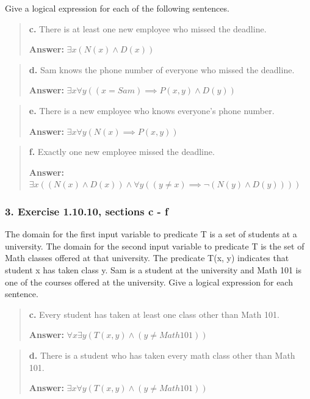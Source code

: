 \documentclass[11pt, oneside]{article}
\begin{document}
Give a logical expression for each of the following sentences.

\begin{quote}
    \textbf{c. }There is at least one new employee who missed the deadline.

    \textbf{Answer:} $\exists x (N(x) \land D(x))$
\end{quote}

\begin{quote}
    \textbf{d. }Sam knows the phone number of everyone who missed the deadline.

    \textbf{Answer:} $\exists x \forall y ((x = Sam) \implies P(x, y) \land D(y))$
\end{quote}

\begin{quote}
    \textbf{e. }There is a new employee who knows everyone's phone number.

    \textbf{Answer:} $\exists x \forall y (N(x) \implies P(x, y))$
\end{quote}

\begin{quote}
    \textbf{f. }Exactly one new employee missed the deadline.

    \textbf{Answer:} $\exists x ((N(x) \land D(x)) \land \forall y ((y \ne x) \implies \neg (N(y) \land D(y))))$
\end{quote}

\subsubsection*{3. Exercise 1.10.10, sections c - f}

The domain for the first input variable to predicate T is a set of students at a university. The domain for the second input variable to predicate T is the set of Math classes offered at that university. The predicate T(x, y) indicates that student x has taken class y. Sam is a student at the university and Math 101 is one of the courses offered at the university. Give a logical expression for each sentence.

\begin{quote}
    \textbf{c. }Every student has taken at least one class other than Math 101.

    \textbf{Answer:} $\forall x \exists y (T(x, y) \land (y \ne Math 101))$
\end{quote}

\begin{quote}
    \textbf{d. }There is a student who has taken every math class other than Math 101.

    \textbf{Answer:} $\exists x \forall y (T(x, y) \land (y \ne Math 101))$
\end{quote}
\end{document}
